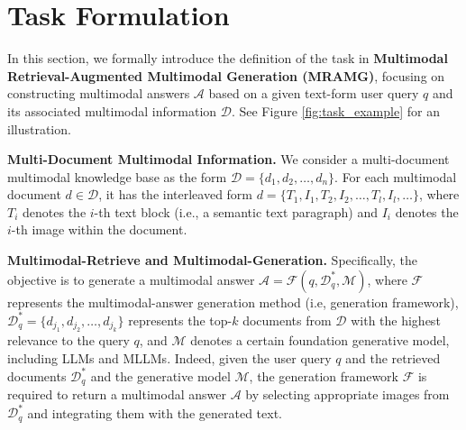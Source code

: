 
\section{Task Formulation}
\label{sec:task_definition}

In this section, we formally introduce the definition of the task in \textbf{Multimodal Retrieval-Augmented Multimodal Generation (MRAMG)}, focusing on constructing multimodal answers $\mathcal{A}$ based on a given text-form user query $q$ and its associated multimodal information $\mathcal{D}$. See Figure \ref{fig:task_example} for an illustration.

\textbf{Multi-Document Multimodal Information.} We consider a multi-document multimodal knowledge base as the form $\mathcal{D} = \{d_1, d_2, \ldots, d_n\}$.
For each multimodal document $d\in \mathcal{D}$, it has the interleaved form $d = \{T_1, I_1, T_2, I_2, \dots, T_l, I_l, \dots \}$, where $T_i$ denotes the $i$-th text block (i.e., a semantic text paragraph) and $I_i$ denotes the $i$-th image within the document.

\textbf{Multimodal-Retrieve and Multimodal-Generation.} Specifically, the objective is to generate a multimodal answer $\mathcal{A} = \mathcal{F}(q, \mathcal{D}^*_q, \mathcal{M})$, where $\mathcal{F}$ represents the multimodal-answer generation method (i.e, generation framework), $\mathcal{D}^*_q = \{d_{j_1}, d_{j_2}, \dots, d_{j_k}\}$ 
represents the top-$k$ documents from $\mathcal{D}$ with the highest relevance to the query $q$, and $\mathcal{M}$ denotes a certain foundation generative model, including LLMs and MLLMs.
Indeed, given the user query $q$ and the retrieved documents $\mathcal{D}_q^*$ and the generative model $\mathcal{M}$, the generation framework $\mathcal{F}$ is required to return a multimodal answer $\mathcal{A}$ by selecting appropriate images from $\mathcal{D}_q^*$ and integrating them with the generated text.

